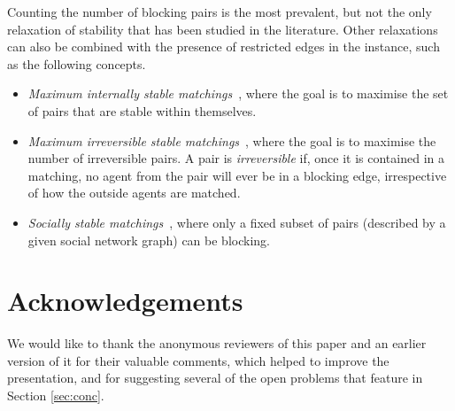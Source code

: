 \documentclass[preprint,12pt]{elsarticle}
\begin{document}
Counting the number of blocking pairs is the most prevalent, but not the only relaxation of stability that has been studied in the literature. Other relaxations can also be combined with the presence of restricted edges in the instance, such as the following concepts.
\begin{itemize}
 \item \emph{Maximum internally stable matchings}~\cite{Tan90}, where the goal is to maximise the set of pairs that are stable within themselves. 
 \item \emph{Maximum irreversible stable matchings}~\cite{BIM16}, where the goal is to maximise the number of irreversible pairs. A pair is \emph{irreversible} if, once it is contained in a matching, no agent from the pair will ever be in a blocking edge, irrespective of how the outside agents are matched.
 \item \emph{Socially stable matchings}~\cite{AIKMP13}, where only a fixed subset of pairs (described by a given social network graph) can be blocking.
\end{itemize}

\section*{Acknowledgements}
We would like to thank the anonymous reviewers of this paper and an earlier version of it for their valuable comments, which helped to improve the presentation, and for suggesting several of the open problems that feature in Section \ref{sec:conc}.

 
\end{document}
